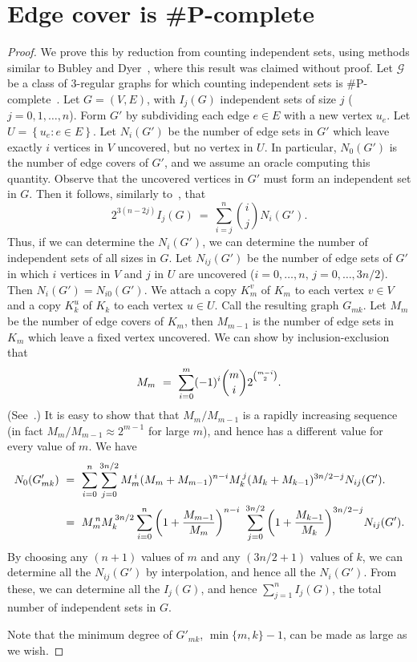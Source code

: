 \documentclass[11pt]{article}
\theoremstyle{definition}
\theoremstyle{remark}
\newcommand{\set}[1]{\left\{#1\right\}}
\newcommand{\CG}{\mathcal{G}}
\newcommand{\binpower}[2]{#1\rule{0in}{2.2ex}^{{\binom{#2}{2}}}}
\begin{document}
\section{Edge cover is \#P-complete}
\label{app1}
\begin{proof}
We prove this by reduction from counting independent sets, using methods
similar to Bubley and Dyer~\cite{BD97}, where this result was claimed
without proof. Let $\CG$ be a class of $3$-regular graphs for which
counting independent sets is \#P-complete~\cite[Theorem 3.1]{G00}. Let
$G=(V,E)$, with $I_j(G)$ independent sets of size $j$ ($j=0,1,\ldots,n$).
Form $G'$ by subdividing each edge $e\in E$ with a new vertex $u_e$. Let
$U=\set{u_e:e\in E}$. Let $N_i(G')$ be the number of edge sets in $G'$
which leave exactly $i$ vertices in $V$ uncovered, but no vertex in $U$. In
particular, $N_0(G')$ is the number of edge covers of $G'$, and we assume
an oracle computing this quantity. Observe that the uncovered vertices in
$G'$ must form an independent set in $G$. Then it follows, similarly
to~\cite{BD97}, that
\[ 2^{3(n-2j)}I_j(G)\ =\ \sum_{i=j}^n \binom{i}{j}N_i(G').\]
Thus, if we can determine the $N_i(G')$, we can determine the number of
independent sets of all sizes in $G$. Let $N_{ij}(G')$ be the number of
edge sets of $G'$ in which $i$ vertices in $V$ and $j$ in $U$ are
uncovered ($i=0,\ldots,n,\,j=0,\ldots,3n/2$). Then
$N_{i}(G')=N_{i0}(G')$. We attach a copy $K_m^v$ of $K_m$ to each vertex
$v\in V$ and a copy $K_k^u$ of $K_k$ to each vertex $u\in U$. Call the
resulting graph $G_{mk}$.  Let $M_m$ be the number of edge covers of $K_m$,
then $M_{m-1}$ is the number of edge sets in $K_m$ which leave a fixed
vertex uncovered. We can show by inclusion-exclusion that
\begin{equation*}
    M_m\ =\ \sum_{i=0}^{m}(-1)^i \binom{m}{i}
    \binpower{2}{m-i}.
\end{equation*}
(See~\cite{S04}.) It is easy to show that that $M_m/M_{m-1}$ is a rapidly
increasing sequence (in fact $M_m/M_{m-1}\approx 2^{m-1}$ for large $m$),
and hence has a different value for every value of $m$. We have
\begin{align}
N_{0}(G'_{mk})\ &=\ \sum_{i=0}^n \sum_{j=0}^{3n/2} M_m^{\,i}
(M_m+M_{m-1})^{n-i} M_k^{\,j} (M_k+M_{k-1})^{3n/2-j}
N_{ij}(G').\label{app1-eq0}\\
&=\ M_m^{\,n}M_k^{\,3n/2}\sum_{i=0}^n
\bigg(1+\frac{M_{m-1}}{M_m}\bigg)^{n-i}\ \sum_{j=0}^{3n/2}
\bigg(1+\frac{M_{k-1}}{M_k}\bigg)^{3n/2-j}N_{ij}(G').\notag
\end{align}
By choosing any $(n+1)$ values of $m$ and any $(3n/2 +1)$ values of $k$, we
can determine all the $N_{ij}(G')$ by interpolation, and hence all the
$N_i(G')$. From these, we can determine all the $I_j(G)$, and hence
$\sum_{j=1}^n I_j(G)$, the total number of independent sets in $G$.

Note that the minimum degree of $G'_{mk}$, $\min\{m,k\}-1$, can be made as
large as we wish.
\end{proof}
\end{document}
